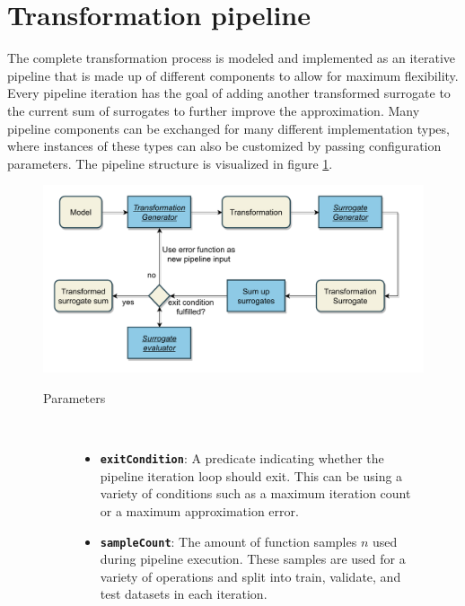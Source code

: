 \documentclass[
  a4paper,  %
  twoside,  %
  bibliography=totoc,
  headsepline,
  cleardoublepage=empty,
  parskip=half,
  draft=false
]{scrbook}
\begin{document}
\newpage
\section{Transformation pipeline}
\label{sec:tp}

The complete transformation process is modeled and implemented as an iterative pipeline that is made up of different components to allow for maximum flexibility.
Every pipeline iteration has the goal of adding another transformed surrogate to the current sum of surrogates to further improve the approximation.
Many pipeline components can be exchanged for many different implementation types, where instances of these types can also be customized by passing configuration parameters.
The pipeline structure is visualized in figure \cref{fig:tp}.

\begin{mdframed}[style=style,frametitle={Transformation Pipeline}]
\begin{figure}[H]

\includegraphics[width=\textwidth]{graphics/TransformationPipeline.pdf}
\vspace{-7.5mm}

\delimit

\begin{description}
\item[Parameters] {~ \begin{itemize}[\indent{}]
\item \texttt{\textbf{exitCondition}}: A predicate indicating whether the pipeline iteration loop should exit. This can be using a variety of conditions such as a maximum iteration count or a maximum approximation error.
\item \texttt{\textbf{sampleCount}}: The amount of function samples $n$ used during pipeline execution. These samples are used for a variety of operations and split into train, validate, and test datasets in each iteration.
\end{itemize}}
\end{description}

\delimit

\label{fig:tp}
\end{figure}
\end{mdframed}
\end{document}
